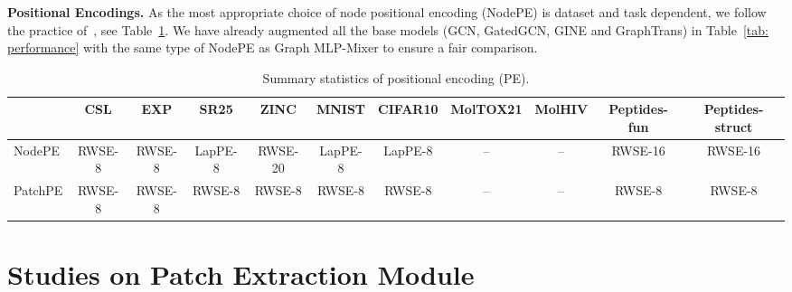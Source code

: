 \documentclass{article}
\begin{document}
\textbf{Positional Encodings.}
As the most appropriate choice of node positional encoding (NodePE) is dataset and task dependent, we follow the practice of~\citet{rampavsek2022recipe, dwivedi2022long}, see Table~\ref{tab: pe}. We have already augmented all the base models (GCN, GatedGCN, GINE and GraphTrans) in Table~\ref{tab: performance} with the same type of NodePE as Graph MLP-Mixer to ensure a fair comparison.
\begin{table}[!ht]
    \centering
    \scriptsize
    \caption{Summary statistics of positional encoding (PE).}
    \begin{tabular}{lcccccccccc}
    \toprule
          &  CSL & EXP& SR25 & ZINC & MNIST & CIFAR10 &MolTOX21 & MolHIV & Peptides-fun & Peptides-struct\\
         \midrule
         NodePE 
         & RWSE-8 & RWSE-8 & LapPE-8 
         &RWSE-20 & LapPE-8 & LapPE-8
         & -- & --
         & RWSE-16 & RWSE-16 \\
         PatchPE 
         & RWSE-8 & RWSE-8 & RWSE-8 & RWSE-8
         & RWSE-8 & RWSE-8
         & -- & --
         & RWSE-8 & RWSE-8 \\
         \bottomrule
    \end{tabular}
    \label{tab: pe}
\end{table}



\section{Studies on Patch Extraction Module}\label{app sec: patch extraction}
\end{document}
